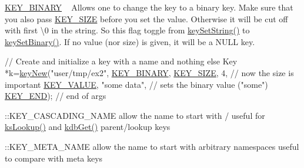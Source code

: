 \begin{DoxyItemize}
\item \hyperlink{group__key_gga91fb3178848bd682000958089abbaf40a1ca18d4e094ae7487d35ecedda2235ff}{K\+E\+Y\+\_\+\+B\+I\+N\+A\+R\+Y} ~\newline
 Allows one to change the key to a binary key. Make sure that you also pass \hyperlink{group__key_gga91fb3178848bd682000958089abbaf40a6d531b5c41445d19d0452eebdccbfa01}{K\+E\+Y\+\_\+\+S\+I\+Z\+E} before you set the value. Otherwise it will be cut off with first \textbackslash{}0 in the string. So this flag toggle from \hyperlink{group__keyvalue_ga622bde1eb0e0c4994728331326340ef2}{key\+Set\+String()} to \hyperlink{group__keyvalue_gaa50a5358fd328d373a45f395fa1b99e7}{key\+Set\+Binary()}. If no value (nor size) is given, it will be a N\+U\+L\+L key. 
\begin{DoxyCodeInclude}
\textcolor{comment}{// Create and initialize a key with a name and nothing else}
Key *k=\hyperlink{group__key_gad23c65b44bf48d773759e1f9a4d43b89}{keyNew}(\textcolor{stringliteral}{"user/tmp/ex2"},
        \hyperlink{group__key_gga91fb3178848bd682000958089abbaf40a1ca18d4e094ae7487d35ecedda2235ff}{KEY\_BINARY},
        \hyperlink{group__key_gga91fb3178848bd682000958089abbaf40a6d531b5c41445d19d0452eebdccbfa01}{KEY\_SIZE}, 4,               \textcolor{comment}{// now the size is important}
        \hyperlink{group__key_gga91fb3178848bd682000958089abbaf40ac66e4a49d09212b79f5754ca6db5bd2e}{KEY\_VALUE}, \textcolor{stringliteral}{"some data"},    \textcolor{comment}{// sets the binary value ("some")}
        \hyperlink{group__key_gga91fb3178848bd682000958089abbaf40aa8adb6fcb92dec58fb19410eacfdd403}{KEY\_END});                  \textcolor{comment}{// end of args}
\end{DoxyCodeInclude}

\item \+::\+K\+E\+Y\+\_\+\+C\+A\+S\+C\+A\+D\+I\+N\+G\+\_\+\+N\+A\+M\+E allow the name to start with / useful for \hyperlink{group__keyset_gaa34fc43a081e6b01e4120daa6c112004}{ks\+Lookup()} and \hyperlink{group__kdb_ga28e385fd9cb7ccfe0b2f1ed2f62453a1}{kdb\+Get()} parent/lookup keys
\item \+::\+K\+E\+Y\+\_\+\+M\+E\+T\+A\+\_\+\+N\+A\+M\+E allow the name to start with arbitrary namespaces useful to compare with meta keys
\end{DoxyItemize}


